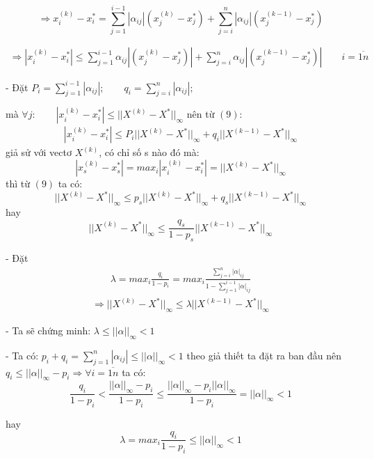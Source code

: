 \documentclass[12pt,a4paper]{article}
\begin{document}
\begin{itemize}
$$\Longrightarrow x_i^{(k)} - x_i^{*} = \sum\limits_{j = 1}^{i - 1} {{|{\alpha}_{ij}|}(x_j^{(k)} - x_j^{*})} + \sum\limits_{j = i}^n {{|{\alpha}_{ij}|}(x_j^{(k - 1)} - x_j^{*})} $$

\begin{align}
\Longrightarrow|x_i^{(k)} - x_i^{*}| \leqslant {\sum\limits_{j = 1}^{i - 1}{{{\alpha}_{ij}} |(x_j^{(k)} - x_j^{*})| + \sum\limits_{j = i}^n {{{\alpha}_{ij}} |(x_j^{(k - 1)} - x_j^{*})| \qquad i = \overline{1n}}}}
\end{align} 

- Đặt $P_i = \sum\limits_{j = 1}^{i - 1} {{|{\alpha}_{ij}|}}; \qquad q_i = \sum\limits_{j = i}^n {{|{\alpha}_{ij}|}}; $

mà $\forall j: \qquad |x_i^{(k)} - x_i^{*}| \leqslant ||X^{(k)} - X^{*}||_{\infty}$ nên từ $(9)$:
\begin{align}
|x_i^{(k)} - x_i^{*}| \leqslant P_i ||X^{(k)} - X^{*}||_{\infty} + q_i ||X^{(k - 1)} - X^{*}||_{\infty}
\end{align}
giả sử với vectơ $X^{(k)}$, có chỉ số s nào đó mà: 
$$ |x_s^{(k)} - x_s^{*}| = max_i |x_i^{(k)} - x_i^{*}| =||X^{(k)} - X^{*}||_{\infty} $$ thì từ $(9)$ ta có:
$$ ||X^{(k)} - X^{*}||_{\infty} \leqslant p_s ||X^{(k)} - X^{*}||_{\infty} + q_s ||X^{(k - 1)} - X^{*}||_{\infty}$$
hay $$ ||X^{(k)} - X^{*}||_{\infty} \leqslant \frac{q_s}{1 - p_s} ||X^{(k - 1)} - X^{*}||_{\infty}$$

- Đặt \begin{align}
\lambda = max_i\frac{q_i}{1 - p_i} = max_i \frac{\sum\limits_{j = i}^n {{|{\alpha}|_{ij}}}}{1 - \sum\limits_{j = 1}^{i - 1} {{|{\alpha}|_{ij}}}}
\end{align} 
\begin{align}
\Longrightarrow ||X^{(k)} - X^{*}||_{\infty} \leqslant \lambda ||X^{(k - 1)} - X^{*}||_{\infty} 
\end{align}

- Ta sẽ chứng minh: $\lambda \leqslant ||\alpha||_{\infty} < 1$

- Ta có: $p_i + q_i = \sum\limits_{j = 1}^n {{|{\alpha}_{ij}|}} \leqslant ||\alpha||_{\infty} < 1$ theo giả thiết ta đặt ra ban đầu nên $q_i \leqslant ||\alpha||_{\infty} - p_i \Rightarrow \forall i = \overline{1n}$ ta có:
$$ \frac{q_i}{1 - p_i} < \frac{||\alpha||_{\infty} - p_i}{1 - p_i} \leqslant \frac{||\alpha||_{\infty} - p_i ||\alpha||_{\infty}}{1 - p_i} = ||\alpha||_{\infty} < 1$$

hay $$ \lambda = max_i \frac{q_i}{1 - p_i} \leqslant ||\alpha||_{\infty} < 1$$


\end{itemize}
\end{document}
